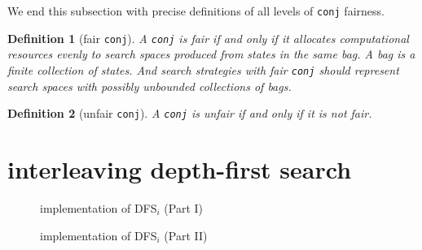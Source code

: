 \documentclass[format=acmlarge, review=true, authordraft=true]{acmart}
\newcommand{\conj}{\texttt{conj}}
\newcommand{\DFSi }[0]{DFS$_{i}$}
\newtheorem{defn}{Definition}[section]
\begin{document}

\begin{center}
	\begin{tabular}{c}
		
	\end{tabular}
\end{center}

We end this subsection with precise definitions of all levels of \conj{} 
fairness.

\begin{defn}[fair \conj{}]
A \conj{} is fair if and only if it allocates computational resources evenly to 
search spaces produced from states in the same bag. A bag is a finite 
collection of states. And search strategies with fair \conj{} should represent 
search spaces with possibly unbounded collections of bags. 
\end{defn}

\begin{defn}[unfair \conj{}]
A \conj{} is unfair if and only if it is not fair.
\end{defn}





\section{interleaving depth-first search}

\begin{figure}
	
	\caption{implementation of \DFSi{} (Part I)}
	\label{DFSi-0}
\end{figure}

\begin{figure}
	
	\caption{implementation of \DFSi{} (Part II)}
	\label{DFSi-1}
\end{figure}
\end{document}
